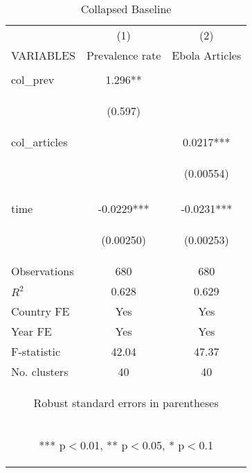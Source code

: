 \documentclass{article}
\begin{document}
\begin{table}[htbp] \centering \caption{Collapsed Baseline \label{Collapsed Baseline}}
\begin{tabular}{lcc} \hline
 & (1) & (2) \\
VARIABLES & Prevalence rate & Ebola Articles \\ \hline
\vspace{4pt} & \begin{footnotesize}\end{footnotesize} & \begin{footnotesize}\end{footnotesize} \\
col\_prev & 1.296** &  \\
\vspace{4pt} & \begin{footnotesize}(0.597)\end{footnotesize} & \begin{footnotesize}\end{footnotesize} \\
col\_articles &  & 0.0217*** \\
 & \begin{footnotesize}\end{footnotesize} & \begin{footnotesize}(0.00554)\end{footnotesize} \\
\vspace{4pt} & \begin{footnotesize}\end{footnotesize} & \begin{footnotesize}\end{footnotesize} \\
time & -0.0229*** & -0.0231*** \\
\vspace{4pt} & \begin{footnotesize}(0.00250)\end{footnotesize} & \begin{footnotesize}(0.00253)\end{footnotesize} \\
Observations & 680 & 680 \\
$R^2$ & 0.628 & 0.629 \\
Country FE & Yes & Yes \\
Year FE & Yes & Yes \\
F-statistic & 42.04 & 47.37 \\
No. clusters & 40 & 40 \\ \hline
\multicolumn{3}{c}{\begin{footnotesize} Robust standard errors in parentheses\end{footnotesize}} \\
\multicolumn{3}{c}{\begin{footnotesize} *** p$<$0.01, ** p$<$0.05, * p$<$0.1\end{footnotesize}} \\
\end{tabular}
\end{table}
\end{document}
